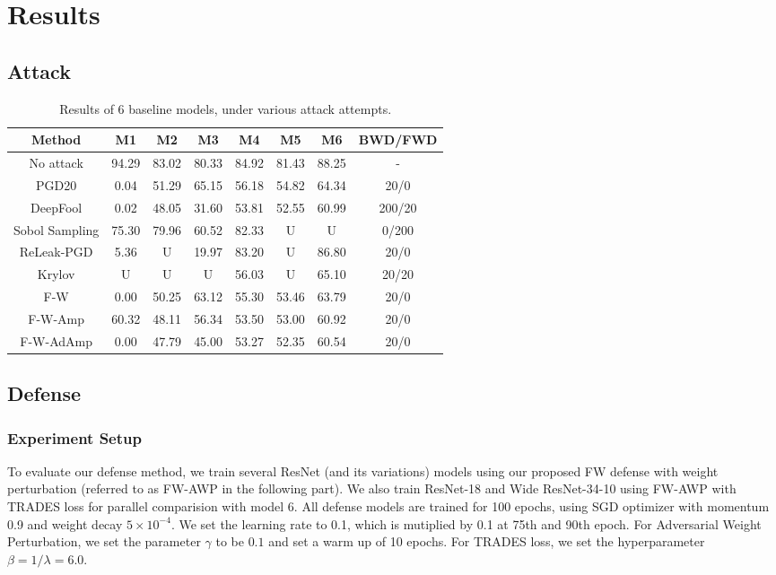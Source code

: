 \documentclass{article}
\begin{document}
\section{Results}\label{sec:Results}
    \subsection{Attack}\label{subs:AttackExp}
    \begin{table}[h]
        \centering
        \begin{tabular}{cccccccc}
        \hline
            Method & M1 & M2 & M3 & M4 & M5 & M6 & BWD/FWD \\ \hline
            No attack & 94.29 & 83.02 & 80.33 & 84.92 & 81.43 & 88.25 & - \\
            PGD20 & 0.04 & 51.29 & 65.15 & 56.18 & 54.82 & 64.34 & 20/0 \\
            DeepFool & 0.02 & 48.05 & 31.60 & 53.81 & 52.55 & 60.99 & 200/20 \\
            Sobol Sampling & 75.30 & 79.96 & 60.52 & 82.33 & U & U & 0/200 \\
            ReLeak-PGD & 5.36 & U & 19.97 & 83.20 & U & 86.80 & 20/0 \\
            Krylov & U & U & U & 56.03 & U & 65.10 & 20/20 \\
            F-W & 0.00 & 50.25 & 63.12 & 55.30 & 53.46 & 63.79 & 20/0 \\
            F-W-Amp & 60.32 & 48.11 & 56.34 & 53.50 & 53.00 & 60.92 & 20/0 \\
            F-W-AdAmp & 0.00 & 47.79 & 45.00 & 53.27 & 52.35 & 60.54 & 20/0 \\ \hline
        \end{tabular}
        \caption{Results of 6 baseline models, under various attack attempts.}
    \end{table}
    \subsection{Defense}\label{subs:DefenseExp}
        \subsubsection{Experiment Setup}\label{subs:DefenseExpSetup}
            To evaluate our defense method, we train several ResNet (and its variations) models using our proposed FW defense with weight perturbation (referred to as FW-AWP in the following part). We also train ResNet-18 and Wide ResNet-34-10 using FW-AWP with TRADES loss for parallel comparision with model 6. All defense models are trained for 100 epochs, using SGD optimizer with momentum 0.9 and weight decay $5\times 10^{-4}$. We set the learning rate to 0.1, which is mutiplied by 0.1 at 75th and 90th epoch. For Adversarial Weight Perturbation, we set the parameter $\gamma$ to be $0.1$ and set a warm up of 10 epochs. For TRADES loss, we set the hyperparameter $\beta = 1/\lambda = 6.0$.
\end{document}
